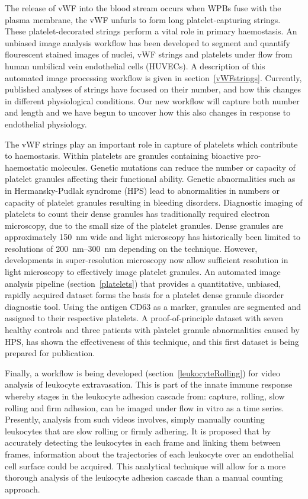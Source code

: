 The release of vWF into the blood stream occurs when WPBs fuse with the plasma membrane, the vWF unfurls to form long platelet-capturing strings. These platelet-decorated strings perform a vital role in primary haemostasis. An unbiased image analysis workflow has been developed to segment and quantify flourescent stained images of nuclei, vWF strings and platelets under flow from human umbilical vein endothelial cells (HUVECs). A description of this automated image processing workflow is given in section~\ref{vWFstrings}. Currently, published analyses of strings have focused on their number, and how this changes in different physiological conditions. Our new workflow will capture both number and length and we have begun to uncover how this also changes in response to endothelial physiology. 

The vWF strings play an important role in capture of platelets which contribute to haemostasis. Within platelets are granules containing bioactive pro-haemostatic molecules.  Genetic mutations can reduce the number or capacity of platelet granules affecting their functional ability. Genetic abnormalities such as in Hermansky-Pudlak syndrome (HPS) lead to abnormalities in numbers or capacity of platelet granules resulting in bleeding disorders. Diagnostic imaging of platelets to count their dense granules has traditionally required electron microscopy, due to the small size of the platelet granules. Dense granules are approximately \SI{150}{\nano\metre} wide and light microscopy has historically been limited to resolutions of  \SIrange{200}{300}{\nano\metre} depending on the technique. However, developments in super-resolution microscopy now allow sufficient resolution in light microscopy to effectively image platelet granules. An automated image analysis pipeline (section~\ref{platelets}) that provides a quantitative, unbiased, rapidly acquired dataset forms the basis for a platelet dense granule disorder diagnostic tool. Using the antigen CD63 as a marker, granules are segmented and assigned to their respective platelets. A proof-of-principle dataset with seven healthy controls and three patients with platelet granule abnormalities caused by HPS, has shown the effectiveness of this technique, and this first dataset is being prepared for publication.

Finally, a workflow is being developed (section~\ref{leukocyteRolling}) for video analysis of leukocyte extravasation. This is part of the innate immune response whereby stages in the leukocyte adhesion cascade from: capture, rolling, slow rolling and firm adhesion, can be imaged under flow in vitro as a time series. Presently, analysis from such videos involves, simply manually counting leukocytes that are slow rolling or firmly adhering. It is proposed that by accurately detecting the leukocytes in each frame and linking them between frames, information about the trajectories of each leukocyte over an endothelial cell surface could be acquired. This analytical technique will allow for a more thorough analysis of the leukocyte adhesion cascade than a manual counting approach.

